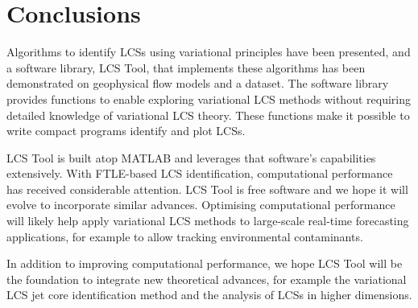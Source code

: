 \documentclass{article}
\begin{document}


\section{Conclusions}

Algorithms to identify LCSs using variational principles have been presented, and a software library, LCS Tool, that implements these algorithms has been demonstrated on geophysical flow models and a dataset. The software library provides functions to enable exploring variational LCS methods without requiring detailed knowledge of variational LCS theory. These functions make it possible to write compact programs identify and plot LCSs.

LCS Tool is built atop MATLAB\parencite{mathworks13:_matlab} and leverages that software's capabilities extensively. With FTLE-based LCS identification, computational performance has received considerable attention\parencite{conti12:_gpu_apu_finit_time_lyapun_expon,miron12:_anisot_lagran_coher_struc}. LCS Tool is free software and we hope it will evolve to incorporate similar advances. Optimising computational performance will likely help apply variational LCS methods to large-scale real-time forecasting applications, for example to allow tracking environmental contaminants.


In addition to improving computational performance, we hope LCS Tool will be the foundation to integrate new theoretical advances, for example the variational LCS jet core identification method\parencite{farazmand13:_shearless} and the 
analysis of LCSs in higher dimensions\parencite{blazevski:_hyper_ellip_trans_barrier_three}.

\printbibliography
\end{document}
